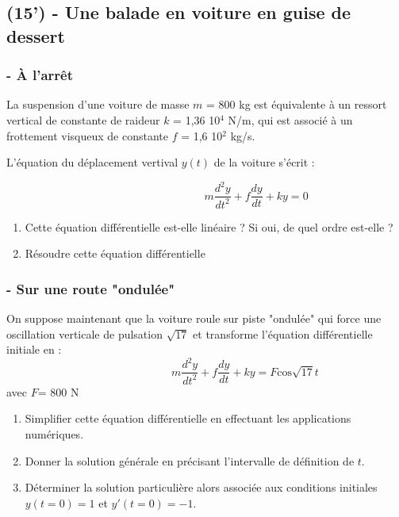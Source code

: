 \documentclass[10pt,a4paper,notitlepage]{article}
\begin{document}
\begin{definition}[]
\subsection*{(15') - Une balade en voiture en guise de dessert  }
\subsubsection*{- À l'arrêt }
La suspension d'une voiture de masse $m$ = 800 kg est équivalente à un ressort vertical de constante de raideur $k$ = 1,36 10$^4$ N/m, qui est associé à un frottement visqueux de constante $f$ = 1,6 10$^2$ kg/s.

L'équation du déplacement vertival $y(t)$ de la voiture s'écrit :

\begin {equation}
\quad  \quad \quad \quad \quad \quad \quad \quad \quad m\frac{d^{2}y}{dt^{2}}+f \frac{dy}{dt} +ky = 0
\end{equation}

\begin{enumerate}
   \item Cette équation différentielle est-elle linéaire ? Si oui, de quel ordre est-elle ? 
   \item Résoudre cette équation différentielle
\end{enumerate}
\subsubsection*{- Sur une route "ondulée"}
 On suppose maintenant que la voiture roule sur piste "ondulée" qui force une oscillation verticale de pulsation $\sqrt{17}$ et transforme l'équation différentielle initiale en :
\begin {equation}
\quad  \quad \quad \quad \quad \quad \quad m\frac{d^{2}y}{dt^{2}}+f \frac{dy}{dt} +ky = F\text{cos} \sqrt{17}t
\end{equation}
avec $F$= 800 N
\begin{enumerate}
   \item Simplifier cette équation différentielle en effectuant les applications numériques.
   \item Donner la solution générale en précisant l'intervalle de définition de $t$.
   \item Déterminer la solution particulière alors associée aux conditions initiales $y(t=0)=1$ et $y'(t=0) = -1$.
 
\end{enumerate}
\end{definition}
\end{document}
